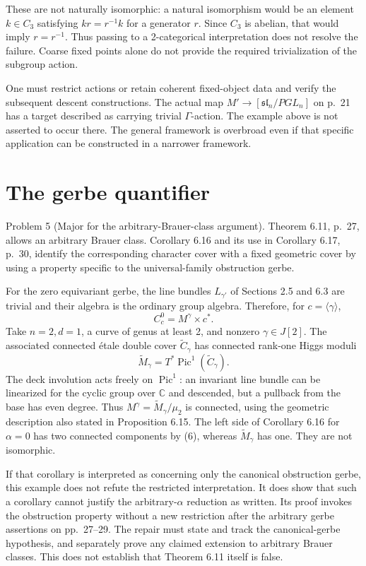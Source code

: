 \documentclass[10pt]{article}
\begin{document}
These are not naturally isomorphic: a natural isomorphism would be an element \(k\in C_3\) satisfying \(kr=r^{-1}k\) for a generator \(r\). Since \(C_3\) is abelian, that would imply \(r=r^{-1}\). Thus passing to a 2-categorical interpretation does not resolve the failure. Coarse fixed points alone do not provide the required trivialization of the subgroup action.\par
One must restrict actions or retain coherent fixed-object data and verify the subsequent descent constructions. The actual map \(M'\to[\mathfrak{sl}_n/PGL_n]\) on p. 21 has a target described as carrying trivial \(\Gamma\)-action. The example above is not asserted to occur there. The general framework is overbroad even if that specific application can be constructed in a narrower framework.\par
\section*{The gerbe quantifier}
Problem 5 (Major for the arbitrary-Brauer-class argument).  Theorem 6.11, p. 27, allows an arbitrary Brauer class. Corollary 6.16 and its use in Corollary 6.17, p. 30, identify the corresponding character cover with a fixed geometric cover by using a property specific to the universal-family obstruction gerbe.\par
For the zero equivariant gerbe, the line bundles \(L_{\gamma'}\) of Sections 2.5 and 6.3 are trivial and their algebra is the ordinary group algebra. Therefore, for \(c=\langle\gamma\rangle\), \[C_c^0=M^\gamma\times c^* .                             \tag{6}\] Take \(n=2,d=1\), a curve of genus at least 2, and nonzero \(\gamma\in J[2]\). The associated connected étale double cover \(\widetilde C_\gamma\) has connected rank-one Higgs moduli \[\widetilde M_\gamma=T^*\operatorname{Pic}^1(\widetilde C_\gamma).\] The deck involution acts freely on \(\operatorname{Pic}^1\): an invariant line bundle can be linearized for the cyclic group over \(\mathbb C\) and descended, but a pullback from the base has even degree. Thus \(M^\gamma=\widetilde M_\gamma/\mu_2\) is connected, using the geometric description also stated in Proposition 6.15. The left side of Corollary 6.16 for \(\alpha=0\) has two connected components by (6), whereas \(\widetilde M_\gamma\) has one. They are not isomorphic.\par
If that corollary is interpreted as concerning only the canonical obstruction gerbe, this example does not refute the restricted interpretation. It does show that such a corollary cannot justify the arbitrary-\(\alpha\) reduction as written. Its proof invokes the obstruction property without a new restriction after the arbitrary gerbe assertions on pp. 27–29. The repair must state and track the canonical-gerbe hypothesis, and separately prove any claimed extension to arbitrary Brauer classes. This does not establish that Theorem 6.11 itself is false.\par
\end{document}
